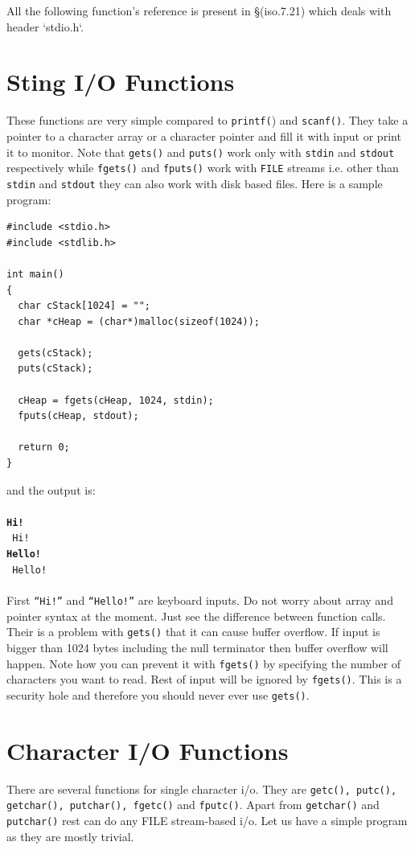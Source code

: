 All the following function's reference is present in \S(iso.7.21) which deals with
header `stdio.h`.

\section{Sting I/O Functions}
These functions are very simple compared to \texttt{printf(}) and
\texttt{scanf()}. They take a pointer to a character array or a character
pointer and fill it with input or print it to monitor. Note that
\texttt{gets()} and \texttt{puts()} work only with \texttt{stdin} and
\texttt{stdout} respectively while \texttt{fgets()} and \texttt{fputs()} work
with \texttt{FILE} streams i.e. other than \texttt{stdin} and \texttt{stdout}
they can also work with disk based files. Here is a sample program:

\begin{Verbatim}[frame=single]
#include <stdio.h>
#include <stdlib.h>

int main()
{
  char cStack[1024] = "";
  char *cHeap = (char*)malloc(sizeof(1024));

  gets(cStack);
  puts(cStack);

  cHeap = fgets(cHeap, 1024, stdin);
  fputs(cHeap, stdout);

  return 0;
}
\end{Verbatim}

and the output is:
\\\\\texttt{\textbf{Hi!\\}
Hi!\\
\textbf{Hello!\\}
Hello!\\\\}
First \texttt{``Hi!''} and \texttt{``Hello!''} are keyboard inputs. Do not
worry about array and pointer syntax at the moment. Just see the difference
between function calls. Their is a problem with \texttt{gets()} that it can
cause buffer overflow. If input is bigger than 1024 bytes including the null
terminator then buffer overflow will happen. Note how you can prevent it with
\texttt{fgets()} by specifying the number of characters you want to read. Rest
of input will be ignored by \texttt{fgets()}. This is a security hole and
therefore you should never ever use \texttt{gets()}.

\section{Character I/O Functions}
There are several functions for single character i/o. They are \texttt{getc(),
  putc(), getchar(), putchar(), fgetc()} and \texttt{fputc()}. Apart from
\texttt{getchar()} and \texttt{putchar()} rest can do any FILE stream-based
i/o. Let us have a simple program as they are mostly trivial.

